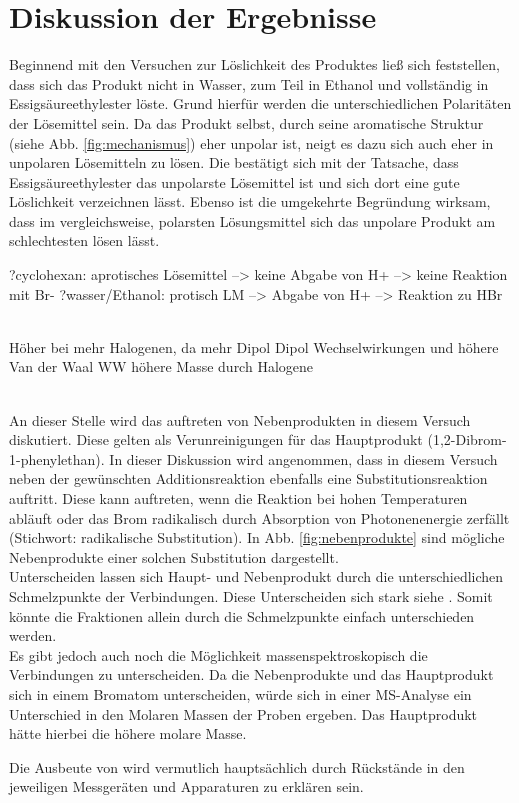 \newpage
\section{Diskussion der Ergebnisse}
\label{sec:diskussion}

Beginnend mit den Versuchen zur Löslichkeit des Produktes ließ sich feststellen, dass sich das Produkt nicht in Wasser, zum Teil in Ethanol und vollständig in Essigsäureethylester löste. Grund hierfür werden die unterschiedlichen Polaritäten der Lösemittel sein. Da das Produkt selbst, durch seine aromatische Struktur (siehe Abb. \ref{fig:mechanismus}) eher unpolar ist, neigt es dazu sich auch eher in unpolaren Lösemitteln zu lösen. Die bestätigt sich mit der Tatsache, dass Essigsäureethylester das unpolarste Lösemittel ist und sich dort eine gute Löslichkeit verzeichnen lässt. Ebenso ist die umgekehrte Begründung wirksam, dass im vergleichsweise, polarsten Lösungsmittel sich das unpolare Produkt am schlechtesten lösen lässt.

?cyclohexan: aprotisches Lösemittel --> keine Abgabe von H+ --> keine Reaktion mit Br-
?wasser/Ethanol: protisch LM --> Abgabe von H+ --> Reaktion zu HBr

\\
Höher bei mehr Halogenen, da mehr Dipol Dipol Wechselwirkungen und höhere Van der Waal WW höhere Masse durch Halogene

\\
An dieser Stelle wird das auftreten von Nebenprodukten in diesem Versuch diskutiert. Diese gelten als Verunreinigungen für das Hauptprodukt (1,2-Dibrom-1-phenylethan). In dieser Diskussion wird angenommen, dass in diesem Versuch neben der gewünschten Additionsreaktion ebenfalls eine Substitutionsreaktion auftritt. Diese kann auftreten, wenn die Reaktion bei hohen Temperaturen abläuft oder das Brom radikalisch durch Absorption von Photonenenergie zerfällt (Stichwort: radikalische Substitution). In Abb. \ref{fig:nebenprodukte} sind mögliche Nebenprodukte einer solchen Substitution dargestellt. \\
Unterscheiden lassen sich Haupt- und Nebenprodukt durch die unterschiedlichen Schmelzpunkte der Verbindungen. Diese Unterscheiden sich stark siehe . Somit könnte die Fraktionen allein durch die Schmelzpunkte einfach unterschieden werden.\\
Es gibt jedoch auch noch die Möglichkeit massenspektroskopisch die Verbindungen zu unterscheiden. Da die Nebenprodukte und das Hauptprodukt sich in einem Bromatom unterscheiden, würde sich in einer MS-Analyse ein Unterschied in den Molaren Massen der Proben ergeben. Das Hauptprodukt hätte hierbei die höhere molare Masse.

Die Ausbeute von  wird vermutlich hauptsächlich durch Rückstände in den jeweiligen Messgeräten und Apparaturen zu erklären sein. \\ 

